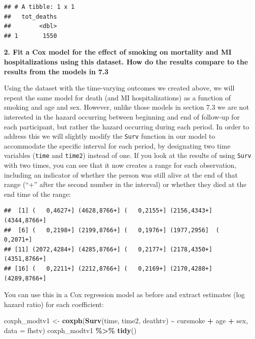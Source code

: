 \documentclass[
]{book}
\newenvironment{Shaded}{\begin{snugshade}}{\end{snugshade}}
\newcommand{\AttributeTok}[1]{\textcolor[rgb]{0.13,0.29,0.53}{#1}}
\newcommand{\DecValTok}[1]{\textcolor[rgb]{0.00,0.00,0.81}{#1}}
\newcommand{\FunctionTok}[1]{\textcolor[rgb]{0.13,0.29,0.53}{\textbf{#1}}}
\newcommand{\NormalTok}[1]{#1}
\newcommand{\OtherTok}[1]{\textcolor[rgb]{0.56,0.35,0.01}{#1}}
\newcommand{\SpecialCharTok}[1]{\textcolor[rgb]{0.81,0.36,0.00}{\textbf{#1}}}
\begin{document}
\begin{verbatim}
## # A tibble: 1 x 1
##   tot_deaths
##        <dbl>
## 1       1550
\end{verbatim}

\textbf{2. Fit a Cox model for the effect of smoking on mortality and MI hospitalizations using this dataset. How do the results compare to the results from the models in 7.3}

Using the dataset with the time-varying outcomes we created above, we will repeat the same model for death (and MI hospitalizations) as a function of smoking and age and sex. However, unlike those models in section 7.3 we are not interested in the hazard occurring between beginning and end of follow-up for each participant, but rather the hazard occurring during each period. In order to address this we will slightly modify the \texttt{Surv} function in our model to accommodate the specific interval for each period, by designating two time variables (\texttt{time} and \texttt{time2}) instead of one. If you look at the results of using \texttt{Surv} with two times, you can see that it now creates a range for each observation, including an indicator of whether the person was still alive at the end of that range (``+'' after the second number in the interval) or whether they died at the end time of the range:

\begin{Shaded}
\end{Shaded}

\begin{verbatim}
##  [1] (   0,4627+] (4628,8766+] (   0,2155+] (2156,4343+] (4344,8766+]
##  [6] (   0,2198+] (2199,8766+] (   0,1976+] (1977,2956]  (   0,2071+]
## [11] (2072,4284+] (4285,8766+] (   0,2177+] (2178,4350+] (4351,8766+]
## [16] (   0,2211+] (2212,8766+] (   0,2169+] (2170,4288+] (4289,8766+]
\end{verbatim}

You can use this in a Cox regression model as before and extract estimates (log hazard ratio) for each coefficient:

\begin{Shaded}
\begin{Highlighting}[]
\NormalTok{coxph\_modtv1 }\OtherTok{\textless{}{-}} \FunctionTok{coxph}\NormalTok{(}\FunctionTok{Surv}\NormalTok{(time, time2, deathtv) }\SpecialCharTok{\textasciitilde{}}\NormalTok{ cursmoke }\SpecialCharTok{+}\NormalTok{ age }\SpecialCharTok{+}\NormalTok{ sex, }
                      \AttributeTok{data =}\NormalTok{ fhstv)}
\NormalTok{coxph\_modtv1 }\SpecialCharTok{\%\textgreater{}\%}
  \FunctionTok{tidy}\NormalTok{()}
\end{Highlighting}
\end{Shaded}
\end{document}
